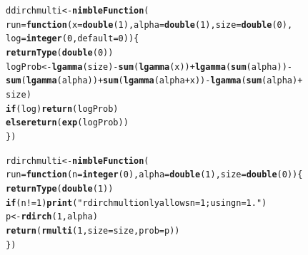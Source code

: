 \documentclass[12pt,oneside]{book}\usepackage[]{graphicx}\usepackage[]{color}
\makeatletter
\newcommand{\hlnum}[1]{\textcolor[rgb]{0.686,0.059,0.569}{#1}}%
\newcommand{\hlstr}[1]{\textcolor[rgb]{0.192,0.494,0.8}{#1}}%
\newcommand{\hlopt}[1]{\textcolor[rgb]{0,0,0}{#1}}%
\newcommand{\hlstd}[1]{\textcolor[rgb]{0.345,0.345,0.345}{#1}}%
\newcommand{\hlkwa}[1]{\textcolor[rgb]{0.161,0.373,0.58}{\textbf{#1}}}%
\newcommand{\hlkwb}[1]{\textcolor[rgb]{0.69,0.353,0.396}{#1}}%
\newcommand{\hlkwc}[1]{\textcolor[rgb]{0.333,0.667,0.333}{#1}}%
\newcommand{\hlkwd}[1]{\textcolor[rgb]{0.737,0.353,0.396}{\textbf{#1}}}%
\newenvironment{kframe}{%
 \def\at@end@of@kframe{}%
 \ifinner\ifhmode%
  \def\at@end@of@kframe{\end{minipage}}%
  \begin{minipage}{\columnwidth}%
 \fi\fi%
 \def\FrameCommand##1{\hskip\@totalleftmargin \hskip-\fboxsep
 \colorbox{shadecolor}{##1}\hskip-\fboxsep
     \hskip-\linewidth \hskip-\@totalleftmargin \hskip\columnwidth}%
 \MakeFramed {\advance\hsize-\width
   \@totalleftmargin\z@ \linewidth\hsize
   \@setminipage}}%
 {\par\unskip\endMakeFramed%
 \at@end@of@kframe}
\newenvironment{knitrout}{}{} %
\makeatother
\begin{document}
\begin{knitrout}
\begin{kframe}
\begin{alltt}
\hlstd{ddirchmulti} \hlkwb{<-} \hlkwd{nimbleFunction}\hlstd{(}
    \hlkwc{run} \hlstd{=} \hlkwa{function}\hlstd{(}\hlkwc{x} \hlstd{=} \hlkwd{double}\hlstd{(}\hlnum{1}\hlstd{),} \hlkwc{alpha} \hlstd{=} \hlkwd{double}\hlstd{(}\hlnum{1}\hlstd{),} \hlkwc{size} \hlstd{=} \hlkwd{double}\hlstd{(}\hlnum{0}\hlstd{),}
        \hlkwc{log} \hlstd{=} \hlkwd{integer}\hlstd{(}\hlnum{0}\hlstd{,} \hlkwc{default} \hlstd{=} \hlnum{0}\hlstd{)) \{}
        \hlkwd{returnType}\hlstd{(}\hlkwd{double}\hlstd{(}\hlnum{0}\hlstd{))}
        \hlstd{logProb} \hlkwb{<-} \hlkwd{lgamma}\hlstd{(size)} \hlopt{-} \hlkwd{sum}\hlstd{(}\hlkwd{lgamma}\hlstd{(x))} \hlopt{+} \hlkwd{lgamma}\hlstd{(}\hlkwd{sum}\hlstd{(alpha))} \hlopt{-}
            \hlkwd{sum}\hlstd{(}\hlkwd{lgamma}\hlstd{(alpha))} \hlopt{+} \hlkwd{sum}\hlstd{(}\hlkwd{lgamma}\hlstd{(alpha} \hlopt{+} \hlstd{x))} \hlopt{-} \hlkwd{lgamma}\hlstd{(}\hlkwd{sum}\hlstd{(alpha)} \hlopt{+}
                                                                 \hlstd{size)}
        \hlkwa{if}\hlstd{(log)} \hlkwd{return}\hlstd{(logProb)}
        \hlkwa{else} \hlkwd{return}\hlstd{(}\hlkwd{exp}\hlstd{(logProb))}
    \hlstd{\})}

\hlstd{rdirchmulti} \hlkwb{<-} \hlkwd{nimbleFunction}\hlstd{(}
    \hlkwc{run} \hlstd{=} \hlkwa{function}\hlstd{(}\hlkwc{n} \hlstd{=} \hlkwd{integer}\hlstd{(}\hlnum{0}\hlstd{),} \hlkwc{alpha} \hlstd{=} \hlkwd{double}\hlstd{(}\hlnum{1}\hlstd{),} \hlkwc{size} \hlstd{=} \hlkwd{double}\hlstd{(}\hlnum{0}\hlstd{)) \{}
        \hlkwd{returnType}\hlstd{(}\hlkwd{double}\hlstd{(}\hlnum{1}\hlstd{))}
        \hlkwa{if}\hlstd{(n} \hlopt{!=} \hlnum{1}\hlstd{)} \hlkwd{print}\hlstd{(}\hlstr{"rdirchmulti only allows n = 1; using n = 1."}\hlstd{)}
        \hlstd{p} \hlkwb{<-} \hlkwd{rdirch}\hlstd{(}\hlnum{1}\hlstd{, alpha)}
        \hlkwd{return}\hlstd{(}\hlkwd{rmulti}\hlstd{(}\hlnum{1}\hlstd{,} \hlkwc{size} \hlstd{= size,} \hlkwc{prob} \hlstd{= p))}
    \hlstd{\})}


\end{alltt}
\end{kframe}
\end{knitrout}
\end{document}
